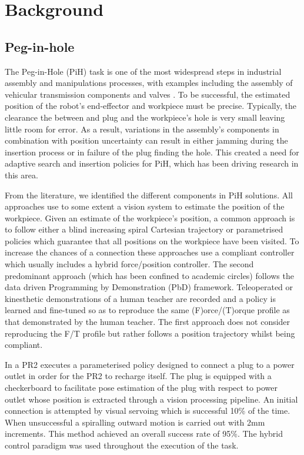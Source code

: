 \section{Background}\label{ch4:background}

\subsection{Peg-in-hole}

The Peg-in-Hole (PiH) task is one of the most widespread steps in industrial assembly and manipulations processes, with 
examples including the assembly of vehicular transmission components \cite{search_strategies_icra_2001} and 
valves \cite{online_gpr_icra_2014}. To be successful, the estimated
position of the robot's end-effector and workpiece must be precise. Typically, the clearance the between 
and plug and the workpiece's hole is very small leaving little room for error. As a result, variations in the assembly's components 
in combination with position uncertainty can result in either jamming during the insertion process or in failure of 
the plug finding the hole. This created a need for adaptive search and insertion policies for PiH, which has been driving research 
in this area. 

From the literature, we identified the different components in PiH solutions. All approaches
use to some extent a vision system to estimate the position of the workpiece. 
Given an estimate of the workpiece's position, 
a common approach is to follow either a blind increasing spiral Cartesian trajectory or parametrised policies 
which guarantee that all positions on the workpiece have been visited. 
To increase the chances of a connection these approaches use a compliant controller 
which usually includes a hybrid force/position controller.
The second predominant approach (which has been confined to academic circles) follows the data driven Programming by Demonstration (PbD) 
framework. Teleoperated or kinesthetic demonstrations of a human teacher are recorded and a policy is learned and fine-tuned 
so as to reproduce the same (F)orce/(T)orque profile as that demonstrated by the human teacher. The first approach 
does not consider reproducing the F/T profile but rather follows a position trajectory whilst being compliant.

In \cite{peg_personal_icra_2010} a PR2 executes a parameterised policy designed to connect a plug to a power outlet
in order for the PR2 to recharge itself. The plug is equipped with a checkerboard to facilitate pose estimation
of the plug with respect to power outlet whose position is extracted through a vision processing pipeline.
An initial connection is attempted by visual servoing which is successful 10\% of the time. When unsuccessful 
a spiralling outward motion is carried out with 2mm increments. This method achieved an overall success rate of 95\%.
The hybrid control paradigm \cite{hybrid_1992} was used throughout the execution of the task.

